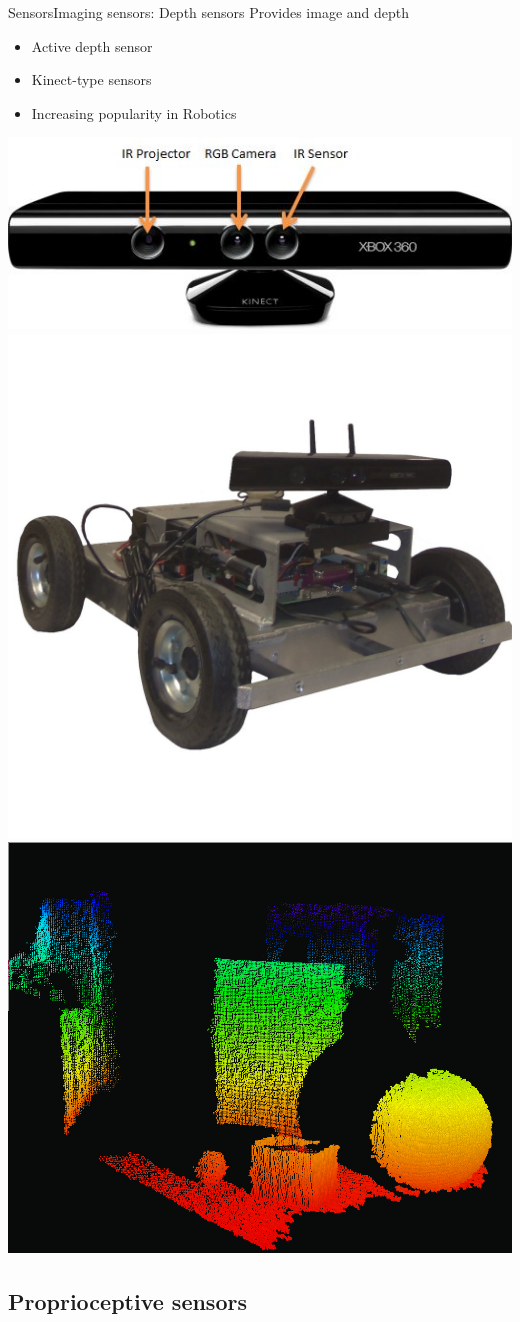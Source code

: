 \documentclass[10pt,compress]{beamer} %
\begin{document}
\begin{frame}{Sensors}{Imaging sensors: Depth sensors}
	Provides image and depth 
	\begin{itemize}
		\item Active depth sensor
		\item Kinect-type sensors
		\item Increasing popularity in Robotics
	\end{itemize}

	\begin{center}
	\includegraphics[width=0.3\linewidth]{figs/kinect.JPG}\enspace 
	\includegraphics[width=0.3\linewidth]{figs/kinectrobot.jpg}\enspace 
	\includegraphics[width=0.3\linewidth]{figs/kinectrviz.png}
	\end{center}
\end{frame}

\subsection{Proprioceptive sensors}
\end{document}

